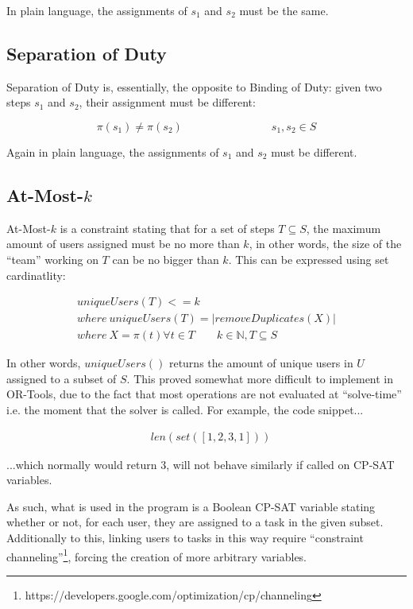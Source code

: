\documentclass[11pt]{article}
\begin{document}
			In plain language, the assignments of \(s_1\) and \(s_2\) must be the same.

		\subsection{Separation of Duty}

			Separation of Duty is, essentially, the opposite to Binding of Duty:
			given two steps \(s_1\) and \(s_2\),
			their assignment must be different:

			\begin{equation}
				\pi(s_1) \neq \pi(s_2) \qquad \qquad \qquad \qquad s_1, s_2 \in S
			\end{equation}

			Again in plain language, the assignments of \(s_1\) and \(s_2\) must be different.

		\subsection{At-Most-\(k\)}

			At-Most-\(k\) is a constraint stating that for a set of steps \(T \subseteq S\),
			the maximum amount of users assigned must be no more than \(k\),
			in other words, the size of the ``team'' working on \(T\) can be no bigger than \(k\).
			This can be expressed using set cardinatlity:

			\begin{multline}
				uniqueUsers(T) <= k\\
				where \ uniqueUsers(T) = |removeDuplicates(X)|\\
				where \ X = \pi(t)\forall t \in T \qquad k \in \mathbb{N}, T \subseteq S
			\end{multline}
			
			In other words, \(uniqueUsers()\) returns the amount of unique users in \(U\) assigned to a subset of \(S\).
			This proved somewhat more difficult to implement in OR-Tools,
			due to the fact that most operations are not evaluated at ``solve-time''
			i.e. the moment that the solver is called. For example, the code snippet...

			\begin{align*}
				&len(set([1,2,3,1]))
			\end{align*}

			...which normally would return \(3\), will not behave similarly if called on CP-SAT variables.

			As such, what is used in the program is a Boolean CP-SAT variable stating whether or not,
			for each user, they are assigned to a task in the given subset.
			Additionally to this, linking users to tasks in this way require ``constraint channeling''\footnote{https://developers.google.com/optimization/cp/channeling},
			forcing the creation of more arbitrary variables.
			
\end{document}
